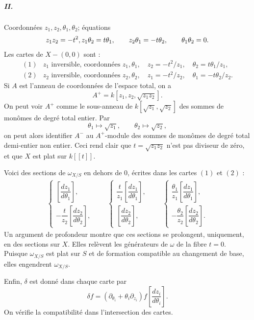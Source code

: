 \documentclass[11pt]{article}
\begin{document}
\subparagraph{II.}
Coordonnées $z_1,z_2,\theta_1,\theta_2$; équations
\[
  z_1z_2=-t^2,\\[-0.4ex]
  z_1\theta_2=t\theta_1,
  \qquad
  z_2\theta_1=-t\theta_2,
  \qquad
  \theta_1\theta_2=0.
\]
Les cartes de $X-(0,0)$ sont :
\[
\begin{array}{ll}
(1)& z_1\text{ inversible, coordonnées }z_1,\theta_1,
\quad z_2=-t^2/z_1,
\quad \theta_2=t\theta_1/z_1,\\[0.6ex]
(2)& z_2\text{ inversible, coordonnées }z_2,\theta_2,
\quad z_1=-t^2/z_2,
\quad \theta_1=-t\theta_2/z_2.
\end{array}
\]
Si $A$ est l'anneau de coordonnées de l'espace total, on a
\[
  A^+=k[z_1,z_2,\sqrt{z_1z_2}].
\]
On peut voir $A^+$ comme le sous-anneau de $k[\sqrt{z_1},\sqrt{z_2}]$ des sommes de monômes de degré total entier. Par
\[
  \theta_1\mapsto\sqrt{z_1},\qquad \theta_2\mapsto\sqrt{z_2},
\]
on peut alors identifier $A^-$ au $A^+$-module des sommes de monômes de degré total demi-entier non entier. Ceci rend clair que $t=\sqrt{z_1z_2}$ n'est pas diviseur de zéro, et que $X$ est plat sur $k[[t]]$.

Voici des sections de $\omega_{X/S}$ en dehors de $0$, écrites dans les cartes $(1)$ et $(2)$ :
\[
\begin{gathered}
  \begin{cases}
  \left[\dfrac{dz_1}{d\theta_1}\right],\\[0.8ex]
  -\dfrac{t}{z_2}\left[\dfrac{dz_2}{d\theta_2}\right],
  \end{cases}
\qquad
  \begin{cases}
  \dfrac{t}{z_1}\left[\dfrac{dz_1}{d\theta_1}\right],\\[0.8ex]
  \left[\dfrac{dz_2}{d\theta_2}\right],
  \end{cases}
\qquad
  \begin{cases}
  \dfrac{\theta_1}{z_1}\left[\dfrac{dz_1}{d\theta_1}\right],\\[1.0ex]
  -\dfrac{\theta_2}{z_2}\left[\dfrac{dz_2}{d\theta_2}\right].
  \end{cases}
\end{gathered}
\]
Un argument de profondeur montre que ces sections se prolongent, uniquement, en des sections sur $X$. Elles relèvent les générateurs de $\omega$ de la fibre $t=0$. Puisque $\omega_{X/S}$ est plat sur $S$ et de formation compatible au changement de base, elles engendrent $\omega_{X/S}$.

Enfin, $\delta$ est donné dans chaque carte par
\[
  \delta f=(\partial_{\theta_i}+\theta_i\partial_{z_i})f
  \left[\frac{dz_i}{d\theta_i}\right].
\]
On vérifie la compatibilité dans l'intersection des cartes.
\end{document}
